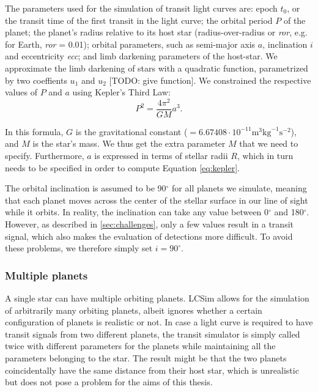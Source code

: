 The parameters used for the simulation of transit light curves are: epoch $t_0$, or the transit time of the first transit in the light curve; the orbital period $P$ of the planet; the planet’s radius relative to its host star (radius-over-radius or \textit{ror}, e.g. for Earth, \textit{ror} = 0.01); orbital parameters, such as semi-major axis $a$, inclination $i$ and eccentricity \textit{ecc}; and limb darkening parameters of the host-star. We approximate the limb darkening of stars with a quadratic function, parametrized by two coeffients $u_1$ and $u_2$ [TODO: give function]. We constrained the respective values of $P$ and $a$ using Kepler’s Third Law:
\begin{equation}
    \label{eq:kepler}
    P^2 = \frac{4 \pi^2}{GM}  a^3.
\end{equation}

In this formula, $G$ is the gravitational constant ($=6.67408 \cdot 10^{-11} \text{m}^3 \text{kg}^{-1} \text{s}^{-2}$), and $M$ is the star’s mass. We thus get the extra parameter $M$ that we need to specify. Furthermore, $a$ is expressed in terms of stellar radii $R$, which in turn needs to be specified in order to compute Equation \ref{eq:kepler}.

The orbital inclination is assumed to be 90$^\circ$ for all planets we simulate, meaning that each planet moves across the center of the stellar surface in our line of sight while it orbits. In reality, the inclination can take any value between 0$^\circ$ and 180$^\circ$. However, as described in \ref{sec:challenges}, only a few values result in a transit signal, which also makes the evaluation of detections more difficult. To avoid these problems, we therefore simply set $i = 90^\circ$.

\subsubsection{Multiple planets}
A single star can have multiple orbiting planets. LCSim allows for the simulation of arbitrarily many orbiting planets, albeit ignores whether a certain configuration of planets is realistic or not. In case a light curve is required to have transit signals from two different planets, the transit simulator is simply called twice with different parameters for the planets while maintaining all the parameters belonging to the star. The result might be that the two planets coincidentally have the same distance from their host star, which is unrealistic but does not pose a problem for the aims of this thesis. 

